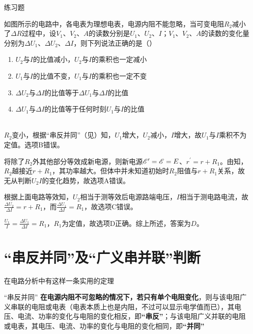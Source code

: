 \begin{ep}{练习题}{}



如图所示的电路中，各电表为理想电表，电源内阻不能忽略，当可变电阻$R_2$减小了$\Delta R$过程中，设$V_1$、$V_2$、$A$的读数分别是$U_1$、$U_2$、$I$；$V_1$、$V_2$、$A$的读数的变化量分别为$\Delta U_1$、$\Delta U_2$、$\Delta I$，则下列说法正确的是（）

\begin{enumerate}[label=(\Alph*)]
  \item $U_2$与$I$的比值减小，$U_2$与$I$的乘积也一定减小
  \item $U_1$与$I$的比值不变，$U_1$与$I$的乘积也一定不变
  \item $\Delta U_2$与$\Delta I$的比值等于$\Delta U_1$与$\Delta I$的比值
  \item $\Delta U_1$与$\Delta I$的比值等于任何时刻$U_1$与$I$的比值
\end{enumerate}

~\\
$R_2$变小，根据“串反并同”（见）知，$U_1$增大，$U_2$减小，$I$增大，故$U_1$与$I$乘积不为定值。选项B错误。

将除了$R_2$外其他部分等效成新电源，则新电源$\mathscr{E}^{\prime} = \mathscr{E} = E$、$r^{\prime} = r + R_1$。由知，$R_2$越接近$r + R_1$，其功率越大。但体中并未知道初始时$R_2$阻值与$r + R_1$关系，故无从判断$U_2 I$的变化趋势，故选项A错误。

根据上面电路等效知，$U_2$相当于测等效后电源路端电压，$I$相当于测电路电流，故$\frac{\Delta U_2}{\Delta I} = r + R_1$，而$\frac{\Delta U_1}{\Delta I} = R_1$，故选项C错误。

$\frac{U_1}{I} = \frac{\Delta U_1}{\Delta I} = R_1$，$R_1$为定值，故选项D正确。综上所述，答案为$D$。
\end{ep}

\section{“串反并同”及“广义串并联”判断}
\label{s_cfbt}

在电路分析中有这样一条实用的定理

\begin{theo}{“串反并同”}{}
\textbf{在电源内阻不可忽略的情况下，若只有单个电阻变化}，则与该电阻广义串联的电阻或电表（电表本质上也是内阻，不过可以显示电学值而已），其电压、电流、功率的变化与电阻的变化相反，即\textbf{“串反”}；与该电阻广义并联的电阻或电表，其电压、电流、功率的变化与电阻的变化相同，即\textbf{“并同”}
\end{theo}

